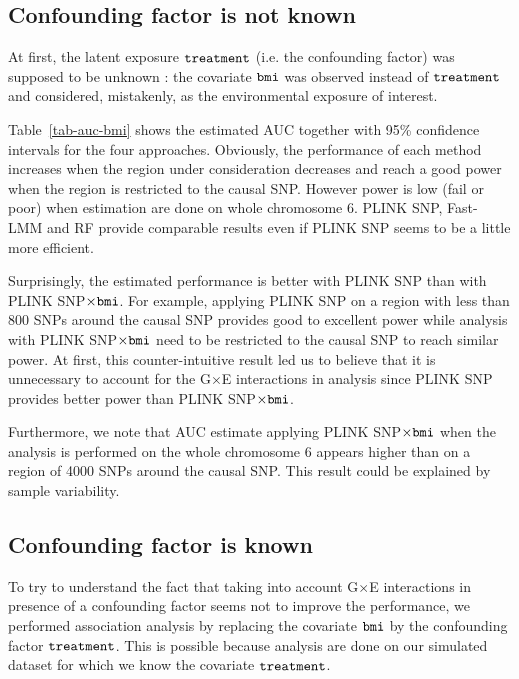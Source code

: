 \documentclass[10pt,a4paper]{article}
\begin{document}
\subsection{Confounding factor is not known}
At first, the latent exposure $\tt{treatment}$ (i.e. the confounding factor) was supposed to be unknown :  the covariate $\tt{bmi}$ was observed instead of  $\tt{treatment}$ and considered, mistakenly, as the environmental exposure of interest. 

Table~\ref{tab-auc-bmi} shows the estimated AUC together with 95\% confidence intervals for the four approaches. Obviously, the performance of each method increases when the region under consideration decreases and reach a good power when the region is restricted to the causal SNP.  However power is low (fail or poor) when estimation are done on whole chromosome 6.
PLINK SNP, Fast-LMM and RF provide comparable results even if PLINK SNP seems to be a little more efficient. 

Surprisingly, the estimated performance is better with PLINK SNP than with PLINK SNP$\times \tt{bmi}$. For example, applying PLINK SNP on a region with less than 800 SNPs around the causal SNP provides good to excellent power while analysis with PLINK SNP$\times \tt{bmi}$ need to be restricted to the causal SNP to reach similar power. At first, this counter-intuitive result led us to believe that it is unnecessary to account for the G$\times$E interactions in analysis since PLINK SNP provides better power than PLINK SNP$\times \tt{bmi}$.


Furthermore, we note that AUC estimate applying PLINK SNP$\times \tt{bmi}$ when the analysis is performed on the whole chromosome 6 appears higher than on a region of 4000 SNPs around the causal SNP. This result could be explained by sample variability.



\subsection{Confounding factor is known}

To try to understand the fact that taking into account G$\times$E interactions in presence of a confounding factor seems not to improve the performance, we performed association analysis by replacing the covariate $\tt{bmi}$ by the confounding factor $\tt{treatment}$. This is possible because analysis are done on our simulated dataset for which we know the covariate $\tt{treatment}$. 
\end{document}
